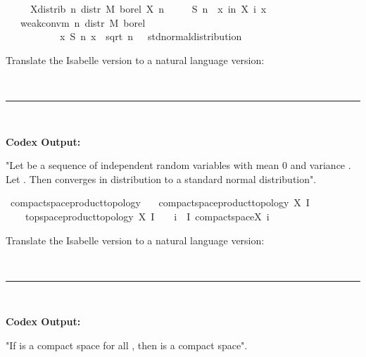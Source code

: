 \documentclass{article}
\begin{document}
\begin{boxB}
\begin{isabelle}
\ \ \ \ \ X{\isacharunderscore}{\kern0pt}distrib{\isacharcolon}{\kern0pt}\ {\isachardoublequoteopen}{\isasymAnd}n{\isachardot}{\kern0pt}\ distr\ M\ borel\ {\isacharparenleft}{\kern0pt}X\ n{\isacharparenright}{\kern0pt}\ {\isacharequal}{\kern0pt}\ {\isasymmu}{\isachardoublequoteclose}\isanewline
\ \ \ {\isachardoublequoteopen}S\ n\ {\isasymequiv}\ {\isasymlambda}x{\isachardot}{\kern0pt}\ {\isasymSum}i{\isacharless}{\kern0pt}n{\isachardot}{\kern0pt}\ X\ i\ x{\isachardoublequoteclose}\isanewline
\ \ \ {\isachardoublequoteopen}weak{\isacharunderscore}{\kern0pt}conv{\isacharunderscore}{\kern0pt}m\ {\isacharparenleft}{\kern0pt}{\isasymlambda}n{\isachardot}{\kern0pt}\ distr\ M\ borel\ \isanewline
\ \ \ \ \ \ \ \ \ \ \ {\isacharparenleft}{\kern0pt}{\isasymlambda}x{\isachardot}{\kern0pt}\ S\ n\ x\ {\isacharslash}{\kern0pt}\ sqrt\ {\isacharparenleft}{\kern0pt}n\ {\isacharasterisk}{\kern0pt}\ {\isasymsigma}\ std{\isacharunderscore}{\kern0pt}normal{\isacharunderscore}{\kern0pt}distribution{\isachardoublequoteclose}
\end{isabelle}
Translate the Isabelle version to a natural language version:

\
\hrule
\

\textbf{Codex Output:}

"Let  be a sequence of independent random variables with mean 0 and variance . Let . Then  converges in distribution to a standard normal distribution".
\end{boxB}


\begin{boxB}
\begin{isabelle}
\isamarkupfalse \ compact{\isacharunderscore}{\kern0pt}space{\isacharunderscore}{\kern0pt}product{\isacharunderscore}{\kern0pt}topology{\isacharcolon}{\kern0pt}\isanewline
\ \ \ {\isachardoublequoteopen}compact{\isacharunderscore}{\kern0pt}space{\isacharparenleft}{\kern0pt}product{\isacharunderscore}{\kern0pt}topology\ X\ I{\isacharparenright}{\kern0pt}\ {\isasymlongleftrightarrow}\isanewline
\ \ \ \ topspace{\isacharparenleft}{\kern0pt}product{\isacharunderscore}{\kern0pt}topology\ X\ I{\isacharparenright}{\kern0pt}\ {\isacharequal}{\kern0pt}\ {\isacharbraceleft}{\kern0pt}{\isacharbraceright}{\kern0pt}\ {\isasymor}\ {\isacharparenleft}{\kern0pt}{\isasymforall}i\ {\isasymin}\ I{\isachardot}{\kern0pt}\ compact{\isacharunderscore}{\kern0pt}space{\isacharparenleft}{\kern0pt}X\ i{\isacharparenright}{\kern0pt}{\isacharparenright}{\kern0pt}{\isachardoublequoteclose}
\end{isabelle}
Translate the Isabelle version to a natural language version:

\
\hrule
\

\textbf{Codex Output:}

"If  is a compact space for all , then  is a compact space".
\end{boxB}
\end{document}
